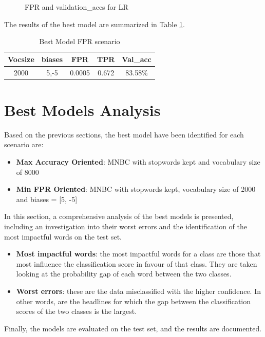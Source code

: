 \documentclass{article}
\begin{document}
\begin{multicols}{2}
\begin{figure}[H]
        \caption{\footnotesize FPR and validation\_accs for LR}
        \label{fig:LR}
    \end{figure}
  
\noindent
The results of the best model are summarized in Table \ref{tab:best_model_lr}.


    \begin{table}[H]
        \small
        \centering
        \begin{tabular}{|c|c|c|c|c|}
        \hline
        \rowcolor{pyblue!60}
        \textbf{Vocsize} & \textbf{biases} & \textbf{FPR} & \textbf{TPR} & \textbf{Val\_acc} \\ \hline
        2000 & 5,-5 & 0.0005 & 0.672 & 83.58\% \\ \hline
        \end{tabular}
        \caption{\footnotesize Best Model FPR scenario}
        \label{tab:best_model_lr}
    \end{table}

    
\section{Best Models Analysis}
Based on the previous sections, the best model have been identified for each scenario are:



    \begin{itemize}[leftmargin=9pt]
        \item \textbf{Max Accuracy Oriented}: MNBC with stopwords kept and vocabulary size of 8000
        \item \textbf{Min FPR Oriented}: MNBC with stopwords kept, vocabulary size of 2000 and biases = [5, -5]
    \end{itemize}

\noindent
In this section, a comprehensive analysis of the best models is presented, including an investigation into their 
worst errors and the identification of the most impactful words on the test set.

    \begin{itemize}[leftmargin=9pt]
        \item \textbf{Most impactful words}: the most impactful words for a class are those that most influence the classification score in favour of that class. They are taken looking at the probability
        gap of each word between the two classes.
        \item \textbf{Worst errors}: these are the data misclassified with the higher confidence. In other words, are the headlines for which the gap between the
        classification scores of the two classes is the largest.
    \end{itemize}
\noindent
Finally, the models are evaluated on the test set, and the results are documented.


\end{multicols}
\end{document}
